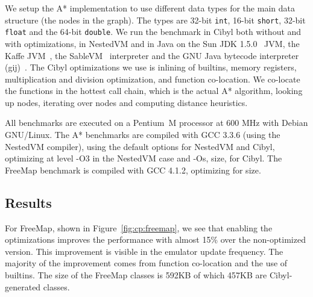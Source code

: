 We setup the A* implementation to use different data types for the main data
structure (the nodes in the graph). The types are 32-bit \texttt{int}, 16-bit
\texttt{short}, 32-bit \texttt{float} and the 64-bit \texttt{double}. We run
the benchmark in Cibyl both without and with optimizations, in NestedVM and in
Java on the Sun JDK 1.5.0~\cite{sunjdk} JVM, the Kaffe JVM~\cite{kaffe}, the
SableVM~\cite{gagon03sablevm} interpreter and the GNU Java bytecode
interpreter (gij)~\cite{gcj}. The Cibyl optimizations we use is inlining of
builtins, memory registers, multiplication and division optimization, and function
co-location. We co-locate the functions in the hottest call chain, which is
the actual A* algorithm, looking up nodes, iterating over nodes and computing
distance heuristics.

All benchmarks are executed on a Pentium~M processor at 600 MHz with Debian
GNU/Linux. The A* benchmarks are compiled with GCC 3.3.6 (using the NestedVM
compiler), using the default options for NestedVM and Cibyl, optimizing at
level -O3 in the NestedVM case and -Os, size, for Cibyl. The FreeMap
benchmark is compiled with GCC 4.1.2, optimizing for size.

\subsection{Results}
For FreeMap, shown in Figure~\ref{fig:cp:freemap}, we see that enabling the
optimizations improves the performance with almost 15\% over the non-optimized
version. This improvement is visible in the emulator update frequency.  The
majority of the improvement comes from function co-location and the use of
builtins. The size of the FreeMap classes is 592KB of which 457KB are
Cibyl-generated classes.

